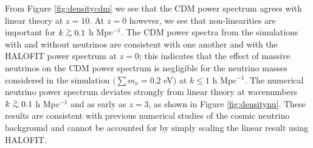 \documentclass[twocolumn,superscriptaddress,prd]{revtex4}
\def\gtsima{$\; \buildrel > \over \sim \;$}
\def\gsim{\lower.5ex\hbox{\gtsima}}
\newcommand{\halofit}{HALOFIT }
\newcommand{\halofitns}{HALOFIT}
\begin{document}
From Figure \ref{fig:densitycdm} we see that the CDM power
spectrum agrees with linear theory at
$z=10$.
At $z=0$ however, we see that non-linearities are important for $k\gsim
0.1$ h Mpc$^{-1}$.  The CDM power spectra from the
simulations with and without neutrinos are
consistent with one another and with
the \halofit power spectrum at $z=0$; this indicates that the
effect of massive neutrinos on the CDM power spectrum
is negligible for the neutrino masses considered in the simulation $\big(\sum
m_\nu = 0.2$ eV$\big)$ at $k\le 1$ h Mpc$^{-1}$.  
The numerical neutrino power spectrum deviates strongly from linear theory at wavenumbers
$k\gsim0.1$ h Mpc$^{-1}$ and as early as $z=3$, as shown in Figure \ref{fig:densitynu}.  These
results are consistent with previous numerical studies of the cosmic
neutrino background
\citep{brandbyge082,inman15} and cannot be
accounted for by simply scaling the linear result using \halofitns.
\end{document}
